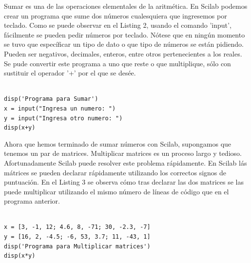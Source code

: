 \documentclass[11pt]{article} %
\begin{document}
Sumar es una de las operaciones elementales de la aritmética. En Scilab podemos crear un programa que sume dos números cualesquiera que ingresemos por teclado. Como se puede observar en el Listing 2, usando el comando 'input', fácilmente se pueden pedir números por teclado. Nótese que en ningún momento se tuvo que específicar un tipo de dato o que tipo de números se están pidiendo. Pueden ser negativos, decimales, enteros, entre otros pertenecientes a los reales. Se pude convertir este programa a uno que reste o que multiplique, sólo con sustituir el operador '+' por el que se desée.

\begin{lstlisting}[caption= Código escrito en Scilab para sumar dos números ingresados por teclado, label=amb, frame=single]  % Start your code-block

disp('Programa para Sumar')
x = input("Ingresa un numero: ")
y = input("Ingresa otro numero: ")
disp(x+y)
\end{lstlisting}

Ahora que hemos terminado de sumar números con Scilab, supongamos que tenemos un par de matrices. Multiplicar matrices es un proceso largo y tedioso. Afortunadamente Scilab puede resolver este problema rápidamente. En Scilab lás mátrices se pueden declarar rápidamente utilizando los correctos signos de puntuación. En el Listing 3 se observa cómo tras declarar las dos  matrices se las puede multiplicar utilizando el mismo número de líneas de código que en el programa anterior.

\begin{lstlisting}[caption= Código escrito en Scilab para multiplicar dos matrices, label=amb, frame=single]  % Start your code-block

x = [3, -1, 12; 4.6, 8, -71; 30, -2.3, -7]
y = [16, 2, -4.5; -6, 53, 3.7; 11, -43, 1]
disp('Programa para Multiplicar matrices')
disp(x*y)

\end{lstlisting}
\end{document}
